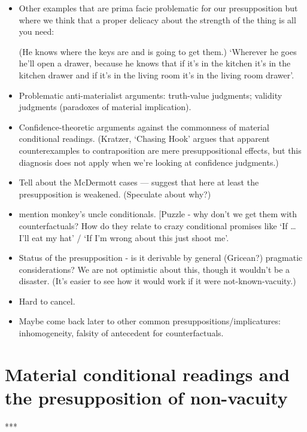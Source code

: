 \documentclass[If.tex]{subfiles}
\begin{document}
\begin{itemize}
	\item
	Other examples that are prima facie problematic for our presupposition but where we think that a proper delicacy about the strength of the thing is all you need:

 (He knows where the keys are and is going to get them.) ‘Wherever he goes he'll open a drawer, because he knows that if it's in the kitchen it's in the kitchen drawer and if it's in the living room it's in the living room drawer’.
	\item
	Problematic anti-materialist arguments: truth-value judgments; validity judgments (paradoxes of material implication).
	\item
	Confidence-theoretic arguments against the commonness of material conditional readings.  (Kratzer, ‘Chasing Hook’ argues that apparent counterexamples to contraposition are mere presuppositional effects, but this diagnosis does not apply when we're looking at confidence judgments.)
	\item
	Tell about the McDermott cases --- suggest that here at least the presupposition is weakened. (Speculate about why?)
	\item
	mention monkey's uncle conditionals. {[}Puzzle - why don't we get them with counterfactuals? How do they relate to crazy conditional promises like ‘If \ldots{} I'll eat my hat’ / ‘If I'm wrong about this just shoot me’.
	\item
	Status of the presupposition - is it derivable by general (Gricean?) pragmatic considerations? We are not optimistic about this, though it wouldn't be a disaster. (It's easier to see how it would work if it were not-known-vacuity.)
	\item
	Hard to cancel.
	\item
	Maybe come back later to other common presuppositions/implicatures: inhomogeneity, falsity of antecedent for counterfactuals. 
\end{itemize}

\section{Material conditional readings and the presupposition of non-vacuity}
\label{sect:material}
***
\end{document}
